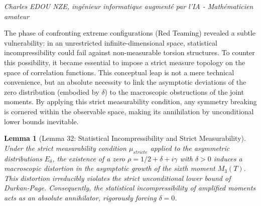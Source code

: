 \documentclass[
]{article}
\newtheorem{lemma}{Lemma}
\begin{document}
\vspace{1cm}\begin{flushright}\textit{Charles EDOU NZE, ingénieur informatique augmenté par l'IA - Mathématicien amateur}\end{flushright}

The phase of confronting extreme configurations (Red Teaming) revealed a subtle vulnerability: in an unrestricted infinite-dimensional space, statistical incompressibility could fail against non-measurable torsion structures. To counter this possibility, it became essential to impose a strict measure topology on the space of correlation functions. This conceptual leap is not a mere technical convenience, but an absolute necessity to link the asymptotic deviations of the zero distribution (embodied by $\delta$) to the macroscopic obstructions of the joint moments. By applying this strict measurability condition, any symmetry breaking is cornered within the observable space, making its annihilation by unconditional lower bounds inevitable.

\begin{lemma}[Lemma 32: Statistical Incompressibility and Strict Measurability]
Under the strict measurability condition $\mu_{stricte}$ applied to the asymmetric distributions $E_\delta$, the existence of a zero $\rho = 1/2 + \delta + i\gamma$ with $\delta > 0$ induces a macroscopic distortion in the asymptotic growth of the sixth moment $M_3(T)$. This distortion irreducibly violates the strict unconditional lower bound of Durkan-Page. Consequently, the statistical incompressibility of amplified moments acts as an absolute annihilator, rigorously forcing $\delta = 0$.
\end{lemma}
\end{document}
